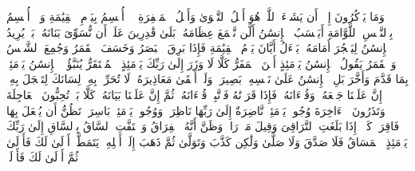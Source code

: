 \startbuffer[\q:74:56]
وَمَا یَذۡكُرُونَ إِلَّاۤ أَن یَشَاۤءَ ٱللَّهُۚ هُوَ أَهۡلُ ٱلتَّقۡوَىٰ وَأَهۡلُ ٱلۡمَغۡفِرَةِ%
\stopbuffer
\startbuffer[\q:75:1]
لَاۤ أُقۡسِمُ بِیَوۡمِ ٱلۡقِیَٰمَةِ%
\stopbuffer
\startbuffer[\q:75:2]
وَلَاۤ أُقۡسِمُ بِٱلنَّفۡسِ ٱللَّوَّامَةِ%
\stopbuffer
\startbuffer[\q:75:3]
أَیَحۡسَبُ ٱلۡإِنسَٰنُ أَلَّن نَّجۡمَعَ عِظَامَهُۥ%
\stopbuffer
\startbuffer[\q:75:4]
بَلَىٰ قَٰدِرِینَ عَلَىٰۤ أَن نُّسَوِّیَ بَنَانَهُۥ%
\stopbuffer
\startbuffer[\q:75:5]
بَلۡ یُرِیدُ ٱلۡإِنسَٰنُ لِیَفۡجُرَ أَمَامَهُۥ%
\stopbuffer
\startbuffer[\q:75:6]
یَسۡءَلُ أَیَّانَ یَوۡمُ ٱلۡقِیَٰمَةِ%
\stopbuffer
\startbuffer[\q:75:7]
فَإِذَا بَرِقَ ٱلۡبَصَرُ%
\stopbuffer
\startbuffer[\q:75:8]
وَخَسَفَ ٱلۡقَمَرُ%
\stopbuffer
\startbuffer[\q:75:9]
وَجُمِعَ ٱلشَّمۡسُ وَٱلۡقَمَرُ%
\stopbuffer
\startbuffer[\q:75:10]
یَقُولُ ٱلۡإِنسَٰنُ یَوۡمَئِذٍ أَیۡنَ ٱلۡمَفَرُّ%
\stopbuffer
\startbuffer[\q:75:11]
كَلَّا لَا وَزَرَ%
\stopbuffer
\startbuffer[\q:75:12]
إِلَىٰ رَبِّكَ یَوۡمَئِذٍ ٱلۡمُسۡتَقَرُّ%
\stopbuffer
\startbuffer[\q:75:13]
یُنَبَّؤُا۟ ٱلۡإِنسَٰنُ یَوۡمَئِذِۭ بِمَا قَدَّمَ وَأَخَّرَ%
\stopbuffer
\startbuffer[\q:75:14]
بَلِ ٱلۡإِنسَٰنُ عَلَىٰ نَفۡسِهِۦ بَصِیرَةࣱ%
\stopbuffer
\startbuffer[\q:75:15]
وَلَوۡ أَلۡقَىٰ مَعَاذِیرَهُۥ%
\stopbuffer
\startbuffer[\q:75:16]
لَا تُحَرِّكۡ بِهِۦ لِسَانَكَ لِتَعۡجَلَ بِهِۦۤ%
\stopbuffer
\startbuffer[\q:75:17]
إِنَّ عَلَیۡنَا جَمۡعَهُۥ وَقُرۡءَانَهُۥ%
\stopbuffer
\startbuffer[\q:75:18]
فَإِذَا قَرَأۡنَٰهُ فَٱتَّبِعۡ قُرۡءَانَهُۥ%
\stopbuffer
\startbuffer[\q:75:19]
ثُمَّ إِنَّ عَلَیۡنَا بَیَانَهُۥ%
\stopbuffer
\startbuffer[\q:75:20]
كَلَّا بَلۡ تُحِبُّونَ ٱلۡعَاجِلَةَ%
\stopbuffer
\startbuffer[\q:75:21]
وَتَذَرُونَ ٱلۡءَاخِرَةَ%
\stopbuffer
\startbuffer[\q:75:22]
وُجُوهࣱ یَوۡمَئِذࣲ نَّاضِرَةٌ%
\stopbuffer
\startbuffer[\q:75:23]
إِلَىٰ رَبِّهَا نَاظِرَةࣱ%
\stopbuffer
\startbuffer[\q:75:24]
وَوُجُوهࣱ یَوۡمَئِذِۭ بَاسِرَةࣱ%
\stopbuffer
\startbuffer[\q:75:25]
تَظُنُّ أَن یُفۡعَلَ بِهَا فَاقِرَةࣱ%
\stopbuffer
\startbuffer[\q:75:26]
كَلَّاۤ إِذَا بَلَغَتِ ٱلتَّرَاقِیَ%
\stopbuffer
\startbuffer[\q:75:27]
وَقِیلَ مَنۡۜ رَاقࣲ%
\stopbuffer
\startbuffer[\q:75:28]
وَظَنَّ أَنَّهُ ٱلۡفِرَاقُ%
\stopbuffer
\startbuffer[\q:75:29]
وَٱلۡتَفَّتِ ٱلسَّاقُ بِٱلسَّاقِ%
\stopbuffer
\startbuffer[\q:75:30]
إِلَىٰ رَبِّكَ یَوۡمَئِذٍ ٱلۡمَسَاقُ%
\stopbuffer
\startbuffer[\q:75:31]
فَلَا صَدَّقَ وَلَا صَلَّىٰ%
\stopbuffer
\startbuffer[\q:75:32]
وَلَٰكِن كَذَّبَ وَتَوَلَّىٰ%
\stopbuffer
\startbuffer[\q:75:33]
ثُمَّ ذَهَبَ إِلَىٰۤ أَهۡلِهِۦ یَتَمَطَّىٰۤ%
\stopbuffer
\startbuffer[\q:75:34]
أَوۡلَىٰ لَكَ فَأَوۡلَىٰ%
\stopbuffer
\startbuffer[\q:75:35]
ثُمَّ أَوۡلَىٰ لَكَ فَأَوۡلَىٰۤ%
